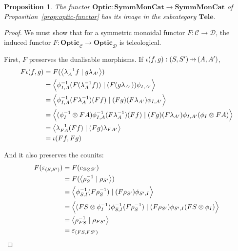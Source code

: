 \documentclass[11pt,letterpaper]{article}
\theoremstyle{plain}
\newtheorem{proposition}[theorem]{Proposition}
\theoremstyle{definition}
\newcommand{\C}{\mathscr{C}}
\newcommand{\D}{\mathscr{D}}
\newcommand{\SymmMonCat}{\mathbf{SymmMonCat}}
\newcommand{\Tele}{\mathbf{Tele}}
\newcommand{\Optic}{\mathbf{Optic}}
\newcommand{\rep}[2]{{\ensuremath \left\langle #1 \mid #2 \right\rangle}}
\newcommand{\hto}{\ensuremath{\,\mathaccent\shortmid\rightarrow\,}}
\newcommand{\todo}[1]{\textcolor{red}{\small #1}}
\begin{document}
\begin{proposition}
  The functor $\Optic : \SymmMonCat \to \SymmMonCat$ of Proposition~\ref{prop:optic-functor} has its image in the subcategory $\Tele$.
\end{proposition}
\begin{proof}
  We must show that for a symmetric monoidal functor $F : \C \to \D$, the induced functor $F : \Optic_\C \to \Optic_\D$ is teleological.

  First, $F$ preserves the dualisable morphisms. If $\iota(f, g) : (S, S') \hto (A, A')$,
  \begin{align*}
    F\iota(f, g)
    &= F(\rep{\lambda_A^{-1} f}{g \lambda_{A'}}) \\
    &= \rep{\phi^{-1}_{I,A} (F(\lambda_A^{-1} f))}{(F(g \lambda_{A'})) \phi_{I,A'}} \\
    &= \rep{\phi^{-1}_{I,A} (F\lambda_A^{-1}) (Ff)}{(Fg)(F \lambda_{A'}) \phi_{I,A'}} \\
    &= \rep{(\phi^{-1}_I \otimes FA) \phi^{-1}_{I,A} (F\lambda_A^{-1}) (Ff)}{(Fg)(F \lambda_{A'}) \phi_{I,A'} (\phi_I \otimes FA)} \\
    &= \rep{\lambda_{FA}^{-1} (Ff)}{(Fg)\lambda_{FA'}} \\
    &= \iota(Ff, Fg)
  \end{align*}

  And it also preserves the counits:
  \begin{align*}
    F(\varepsilon_{(S, S')})
    &= F(c_{S \otimes S'}) \\
    &= F(\rep{\rho_S^{-1}}{\rho_{S'}}) \\
    &= \rep{\phi^{-1}_{S,I} (F \rho_S^{-1})}{(F \rho_{S'}) \phi_{S',I}} \\
    &= \rep{(FS \otimes \phi_I^{-1}) \phi^{-1}_{S,I} (F \rho_S^{-1})}{(F \rho_{S'}) \phi_{S',I} (FS \otimes \phi_I)} \\
    &= \rep{\rho_{FS}^{-1}}{\rho_{FS'}} \\
    &= \varepsilon_{(FS, FS')}
  \end{align*}

\end{proof}
\end{document}
